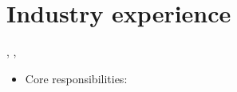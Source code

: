 
\section*{Industry experience}
, , 
\begin{itemize}
  \item{
    Core responsibilities:
  }
\end{itemize}